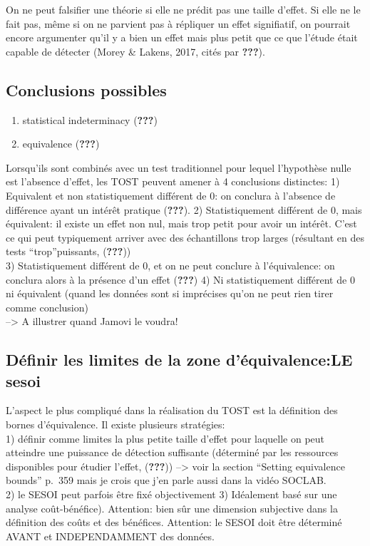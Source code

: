 \documentclass[
  english,
  man]{apa6}
\providecommand{\tightlist}{%
  \setlength{\itemsep}{0pt}\setlength{\parskip}{0pt}}
\begin{document}
On ne peut falsifier une théorie si elle ne prédit pas une taille d'effet. Si elle ne le fait pas, même si on ne parvient pas à répliquer un effet signifiatif, on pourrait encore argumenter qu'il y a bien un effet mais plus petit que ce que l'étude était capable de détecter (Morey \& Lakens, 2017, cités par {\textbf{???}}).

\hypertarget{conclusions-possibles}{%
\subsection{Conclusions possibles}\label{conclusions-possibles}}

\begin{enumerate}
\def\labelenumi{\arabic{enumi})}
\tightlist
\item
  statistical indeterminacy ({\textbf{???}})
\item
  equivalence ({\textbf{???}})
\end{enumerate}

Lorsqu'ils sont combinés avec un test traditionnel pour lequel l'hypothèse nulle est l'absence d'effet, les TOST peuvent amener à 4 conclusions distinctes:
1) Equivalent et non statistiquement différent de 0: on conclura à l'absence de différence ayant un intérêt pratique ({\textbf{???}}).
2) Statistiquement différent de 0, mais équivalent: il existe un effet non nul, mais trop petit pour avoir un intérêt. C'est ce qui peut typiquement arriver avec des échantillons trop larges (résultant en des tests \enquote{trop}puissants, ({\textbf{???}}))\\
3) Statistiquement différent de 0, et on ne peut conclure à l'équivalence: on conclura alors à la présence d'un effet ({\textbf{???}})
4) Ni statistiquement différent de 0 ni équivalent (quand les données sont si imprécises qu'on ne peut rien tirer comme conclusion)\\
--\textgreater{} A illustrer quand Jamovi le voudra!

\hypertarget{duxe9finir-les-limites-de-la-zone-duxe9quivalencele-sesoi}{%
\subsection{Définir les limites de la zone d'équivalence:LE sesoi}\label{duxe9finir-les-limites-de-la-zone-duxe9quivalencele-sesoi}}

L'aspect le plus compliqué dans la réalisation du TOST est la définition des bornes d'équivalence. Il existe plusieurs stratégies:\\
1) définir comme limites la plus petite taille d'effet pour laquelle on peut atteindre une puissance de détection suffisante (déterminé par les ressources disponibles pour étudier l'effet, ({\textbf{???}})) --\textgreater{} voir la section \enquote{Setting equivalence bounds} p.~359 mais je crois que j'en parle aussi dans la vidéo SOCLAB.\\
2) le SESOI peut parfois être fixé objectivement
3) Idéalement basé sur une analyse coût-bénéfice). Attention: bien sûr une dimension subjective dans la définition des coûts et des bénéfices.
Attention: le SESOI doit être déterminé AVANT et INDEPENDAMMENT des données.
\end{document}
